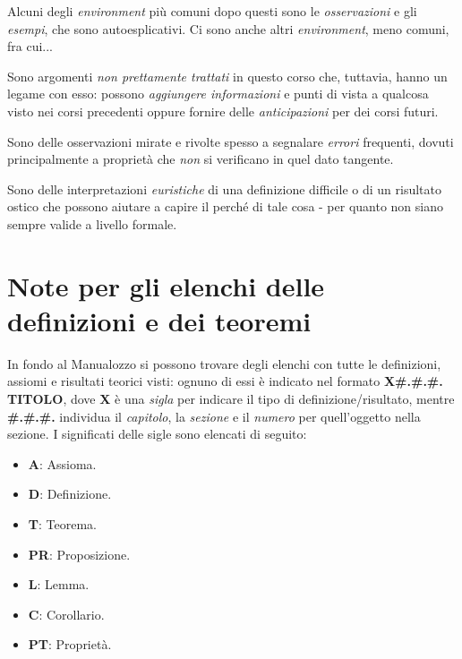 \noindent Alcuni degli \textit{environment} più comuni dopo questi sono le \textit{osservazioni} e gli \textit{esempi}, che sono autoesplicativi. Ci sono anche altri \textit{environment}, meno comuni, fra cui...
\begin{digression}
	Sono argomenti \textit{non prettamente trattati} in questo corso che, tuttavia, hanno un legame con esso: possono \textit{aggiungere informazioni} e punti di vista a qualcosa visto nei corsi precedenti oppure fornire delle \textit{anticipazioni} per dei corsi futuri.
\end{digression}
\begin{attention}
	Sono delle osservazioni mirate e rivolte spesso a segnalare \textit{errori} frequenti, dovuti principalmente a proprietà che \textit{non} si verificano in quel dato tangente. 
\end{attention}
\begin{intuit}
	Sono delle interpretazioni \textit{euristiche} di una definizione difficile o di un risultato ostico che possono aiutare a capire il perché di tale cosa - per quanto non siano sempre valide a livello formale. 
\end{intuit}
\section*{Note per gli elenchi delle definizioni e dei teoremi}
In fondo al Manualozzo si possono trovare degli elenchi con tutte le definizioni, assiomi e risultati teorici visti: ognuno di essi è indicato nel formato \textbf{\textsc{X\#.\#.\#. TITOLO}}, dove \textbf{\textsc{X}} è una \textit{sigla} per indicare il tipo di definizione/risultato, mentre \textbf{\textsc{\#.\#.\#.}} individua il \textit{capitolo}, la \textit{sezione} e il \textit{numero} per quell'oggetto nella sezione. I significati delle sigle sono elencati di seguito:
\begin{multicols}{2}
	\begin{itemize}
		\item \textbf{\textsc{A}}: Assioma.
		\item \textbf{\textsc{D}}: Definizione.
		\item \textbf{\textsc{T}}: Teorema.
		\item \textbf{\textsc{PR}}: Proposizione.
		\item \textbf{\textsc{L}}: Lemma.
		\item \textbf{\textsc{C}}: Corollario.
		\item \textbf{\textsc{PT}}: Proprietà.
	\end{itemize}
\end{multicols}


